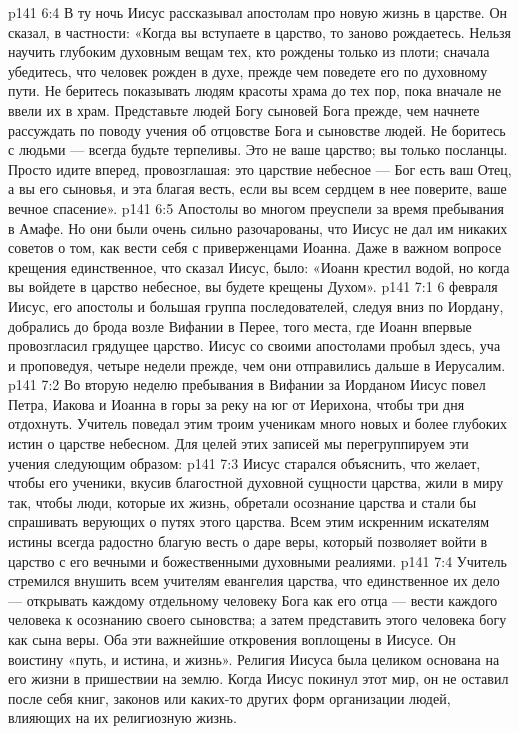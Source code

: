 \vs p141 6:4 \pc В ту ночь Иисус рассказывал апостолам про новую жизнь в царстве. Он сказал, в частности: «Когда вы вступаете в царство, то заново рождаетесь. Нельзя научить глубоким духовным вещам тех, кто рождены только из плоти; сначала убедитесь, что человек рожден в духе, прежде чем поведете его по духовному пути. Не беритесь показывать людям красоты храма до тех пор, пока вначале не ввели их в храм. Представьте людей Богу  сыновей Бога прежде, чем начнете рассуждать по поводу учения об отцовстве Бога и сыновстве людей. Не боритесь с людьми --- всегда будьте терпеливы. Это не ваше царство; вы только посланцы. Просто идите вперед, провозглашая: это царствие небесное --- Бог есть ваш Отец, а вы его сыновья, и эта благая весть, если вы всем сердцем в нее поверите,  ваше вечное спасение».
\vs p141 6:5 Апостолы во многом преуспели за время пребывания в Амафе. Но они были очень сильно разочарованы, что Иисус не дал им никаких советов о том, как вести себя с приверженцами Иоанна. Даже в важном вопросе крещения единственное, что сказал Иисус, было: «Иоанн крестил водой, но когда вы войдете в царство небесное, вы будете крещены Духом».
\vs p141 7:1 6 февраля Иисус, его апостолы и большая группа последователей, следуя вниз по Иордану, добрались до брода возле Вифании в Перее, того места, где Иоанн впервые провозгласил грядущее царство. Иисус со своими апостолами пробыл здесь, уча и проповедуя, четыре недели прежде, чем они отправились дальше в Иерусалим.
\vs p141 7:2 Во вторую неделю пребывания в Вифании за Иорданом Иисус повел Петра, Иакова и Иоанна в горы за реку на юг от Иерихона, чтобы три дня отдохнуть. Учитель поведал этим троим ученикам много новых и более глубоких истин о царстве небесном. Для целей этих записей мы перегруппируем эти учения следующим образом:
\vs p141 7:3 \pc Иисус старался объяснить, что желает, чтобы его ученики, вкусив благостной духовной сущности царства, жили в миру так, чтобы люди, которые  их жизнь, обретали осознание царства и стали бы спрашивать верующих о путях этого царства. Всем этим искренним искателям истины всегда радостно  благую весть о даре веры, который позволяет войти в царство с его вечными и божественными духовными реалиями.
\vs p141 7:4 Учитель стремился внушить всем учителям евангелия царства, что единственное их дело --- открывать каждому отдельному человеку Бога как его отца --- вести каждого человека к осознанию своего сыновства; а затем представить этого человека богу как сына веры. Оба эти важнейшие откровения воплощены в Иисусе. Он воистину «путь, и истина, и жизнь». Религия Иисуса была целиком основана на его жизни в пришествии на землю. Когда Иисус покинул этот мир, он не оставил после себя книг, законов или каких\hyp{}то других форм организации людей, влияющих на их религиозную жизнь.
